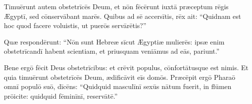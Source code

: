 Timuērunt autem obstetrīcēs Deum, et nōn fēcērunt iuxtā præceptum rēgis Ægyptī, sed cōnservābant marēs. 
Quibus ad sē accersītis, rēx ait: ``Quidnam est hoc quod facere voluistis, ut puerōs servārētis?''

Quæ respondērunt: ``Nōn sunt Hebreæ sīcut Ægyptiæ mulierēs: ipsæ enim obstetrīcandī habent scientiam, et priusquam veniāmus ad eās, pariunt.''

Bene ergō fēcit Deus obstetrīcibus: et crēvit populus, cōnfortātusque est nimis.
Et quia timuērunt obstetrīcēs Deum, ædificāvit eīs domōs.
Præcēpit ergō Pharaō omnī populō suō, dīcēns: ``Quidquid masculīnī sexūs nātum fuerit, in flūmen prōicite: quidquid fēminīnī, reservātē.''
